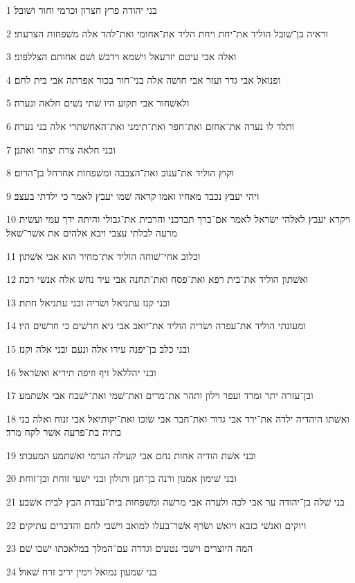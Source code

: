 \par 1 בני יהודה פרץ חצרון וכרמי וחור ושׁובל׃
\par 2 וראיה בן־שׁובל הוליד את־יחת ויחת הליד את־אחומי ואת־להד אלה משׁפחות הצרעתי׃
\par 3 ואלה אבי עיטם יזרעאל וישׁמא וידבשׁ ושׁם אחותם הצללפוני׃
\par 4 ופנואל אבי גדר ועזר אבי חושׁה אלה בני־חור בכור אפרתה אבי בית לחם׃
\par 5 ולאשׁחור אבי תקוע היו שׁתי נשׁים חלאה ונערה׃
\par 6 ותלד לו נערה את־אחזם ואת־חפר ואת־תימני ואת־האחשׁתרי אלה בני נערה׃
\par 7 ובני חלאה צרת יצחר ואתנן׃
\par 8 וקוץ הוליד את־ענוב ואת־הצבבה ומשׁפחות אחרחל בן־הרום׃
\par 9 ויהי יעבץ נכבד מאחיו ואמו קראה שׁמו יעבץ לאמר כי ילדתי בעצב׃
\par 10 ויקרא יעבץ לאלהי ישׂראל לאמר אם־ברך תברכני והרבית את־גבולי והיתה ידך עמי ועשׂית מרעה לבלתי עצבי ויבא אלהים את אשׁר־שׁאל׃
\par 11 וכלוב אחי־שׁוחה הוליד את־מחיר הוא אבי אשׁתון׃
\par 12 ואשׁתון הוליד את־בית רפא ואת־פסח ואת־תחנה אבי עיר נחשׁ אלה אנשׁי רכה׃
\par 13 ובני קנז עתניאל ושׂריה ובני עתניאל חתת׃
\par 14 ומעונתי הוליד את־עפרה ושׂריה הוליד את־יואב אבי גיא חרשׁים כי חרשׁים היו׃
\par 15 ובני כלב בן־יפנה עירו אלה ונעם ובני אלה וקנז׃
\par 16 ובני יהללאל זיף וזיפה תיריא ואשׂראל׃
\par 17 ובן־עזרה יתר ומרד ועפר וילון ותהר את־מרים ואת־שׁמי ואת־ישׁבח אבי אשׁתמע׃
\par 18 ואשׁתו היהדיה ילדה את־ירד אבי גדור ואת־חבר אבי שׂוכו ואת־יקותיאל אבי זנוח ואלה בני בתיה בת־פרעה אשׁר לקח מרד׃
\par 19 ובני אשׁת הודיה אחות נחם אבי קעילה הגרמי ואשׁתמע המעכתי׃
\par 20 ובני שׁימון אמנון ורנה בן־חנן ותולון ובני ישׁעי זוחת ובן־זוחת׃
\par 21 בני שׁלה בן־יהודה ער אבי לכה ולעדה אבי מרשׁה ומשׁפחות בית־עבדת הבץ לבית אשׁבע׃
\par 22 ויוקים ואנשׁי כזבא ויואשׁ ושׂרף אשׁר־בעלו למואב וישׁבי לחם והדברים עתיקים׃
\par 23 המה היוצרים וישׁבי נטעים וגדרה עם־המלך במלאכתו ישׁבו שׁם׃
\par 24 בני שׁמעון נמואל וימין יריב זרח שׁאול׃
